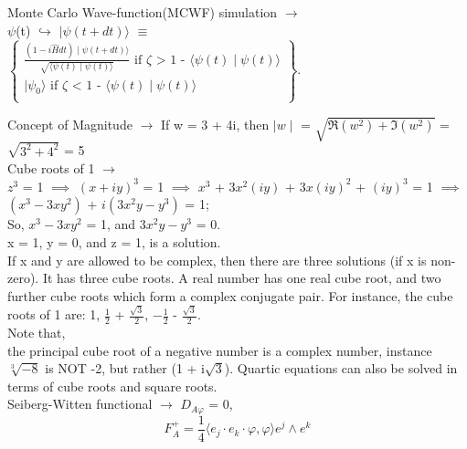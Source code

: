 \documentclass[a4paper, 10pt, onepage]{elegantbook}
\begin{document}
{Monte Carlo Wave-function(MCWF) simulation $\rightarrow$  \\ 

$\psi$(t) $\hookrightarrow$ $\mid \psi(t + dt) \rangle$ $\equiv$  \\

$\left\{
\begin{array} {ll}
\frac{(1 - i \hat H dt) \mid  \psi(t + dt) \rangle}{\sqrt{ \langle \psi(t) \mid \psi(t) \rangle}} \text{ if $\zeta$ > 1 - $\langle \psi(t) \mid\psi(t) \rangle$} \\
\mid \psi_0 \rangle \text{ if $\zeta$ < 1 - $\langle \psi(t) \mid \psi(t) \rangle$} \\
\end{array}
\right\}.$

Concept of Magnitude $\rightarrow$ If w = 3 + 4i, then $\mid w \mid$ = $\sqrt{\Re(w^2) + \Im(w^2)}$ = $\sqrt{3^2 + 4^2}$ = 5  \\

Cube roots of 1 $\rightarrow$  \\

$z^3$ = 1 $\implies$ $(x + iy)^3$ = 1 $\implies$ $x^3$ + $3x^2(iy)$ + $3x(iy)^2$ + $(iy)^3$ = 1 $\implies$ $(x^3 - 3xy^2)$ + $i(3x^2y - y^3)$ = 1;  \\

So, $x^3 - 3xy^2$ = 1, and $3x^2y - y^3$ = 0.  \\

x = 1, y = 0, and z = 1, is a solution. \\ 

If x and y are allowed to be complex, then there are three solutions (if x is non-zero). It has
three cube roots. A real number has one real cube root, and two further cube roots which form a
complex conjugate pair. For instance, the cube roots of 1 are: 1, $\frac{1}{2}$ + $\frac{\sqrt 3}{2}$, $ - \frac{1}{2}$ - $\frac{\sqrt 3}{2}$.  \\ 

Note that,  \\ 
the principal cube root of a negative number is a complex number, instance $\sqrt[3]{-8}$ is NOT -2, but rather (1 + i$\sqrt{3}$). Quartic equations can also be solved in terms of cube roots and square roots. \\

Seiberg-Witten functional $\rightarrow$ $D_{A \varphi}$ = 0,  \\
\begin{equation}
F^+_A = \frac{1}{4} \langle e_j \cdot e_k \cdot \varphi, \varphi \rangle e^j \wedge e^k
\end{equation}

}
\end{document}
